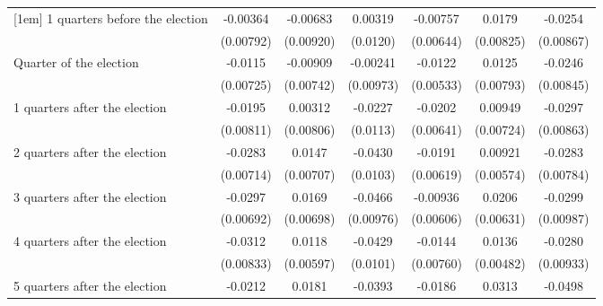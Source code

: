 \begin{table}[htbp]
\begin{tabular}{l*{6}{c}}
[1em]
 1 quarters before the election&    -0.00364         &    -0.00683         &     0.00319         &    -0.00757         &      0.0179\sym{*}  &     -0.0254\sym{**} \\
                    &   (0.00792)         &   (0.00920)         &    (0.0120)         &   (0.00644)         &   (0.00825)         &   (0.00867)         \\
[1em]
Quarter of the election&     -0.0115         &    -0.00909         &    -0.00241         &     -0.0122\sym{*}  &      0.0125         &     -0.0246\sym{**} \\
                    &   (0.00725)         &   (0.00742)         &   (0.00973)         &   (0.00533)         &   (0.00793)         &   (0.00845)         \\
[1em]
 1 quarters after the election&     -0.0195\sym{*}  &     0.00312         &     -0.0227\sym{*}  &     -0.0202\sym{**} &     0.00949         &     -0.0297\sym{***}\\
                    &   (0.00811)         &   (0.00806)         &    (0.0113)         &   (0.00641)         &   (0.00724)         &   (0.00863)         \\
[1em]
 2 quarters after the election&     -0.0283\sym{***}&      0.0147\sym{*}  &     -0.0430\sym{***}&     -0.0191\sym{**} &     0.00921         &     -0.0283\sym{***}\\
                    &   (0.00714)         &   (0.00707)         &    (0.0103)         &   (0.00619)         &   (0.00574)         &   (0.00784)         \\
[1em]
 3 quarters after the election&     -0.0297\sym{***}&      0.0169\sym{*}  &     -0.0466\sym{***}&    -0.00936         &      0.0206\sym{**} &     -0.0299\sym{**} \\
                    &   (0.00692)         &   (0.00698)         &   (0.00976)         &   (0.00606)         &   (0.00631)         &   (0.00987)         \\
[1em]
 4 quarters after the election&     -0.0312\sym{***}&      0.0118\sym{*}  &     -0.0429\sym{***}&     -0.0144         &      0.0136\sym{**} &     -0.0280\sym{**} \\
                    &   (0.00833)         &   (0.00597)         &    (0.0101)         &   (0.00760)         &   (0.00482)         &   (0.00933)         \\
[1em]
 5 quarters after the election&     -0.0212\sym{**} &      0.0181         &     -0.0393\sym{**} &     -0.0186\sym{**} &      0.0313\sym{***}&     -0.0498\sym{***}\\

\end{tabular}
\end{table}
